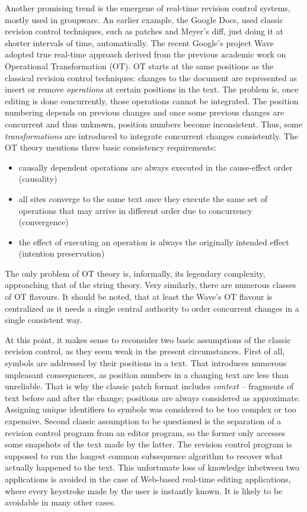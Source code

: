 \documentclass{acm_proc_article-sp}
\begin{document}
Another promising trend is the emergene of real-time
revision control systems, mostly used in groupware.
An earlier example, the Google Docs, used classic revision
control techniques, such as patches and Meyer's diff,
just doing it at shorter intervals of time, automatically.
The recent Google's project Wave adopted true
real-time approach derived from the previous academic
work on Operational Transformation (OT).
OT starts at the same positions as the classical revision
control techniques: changes to the document are represented
as insert or remove \emph{operations} at certain positions in the
text. The problem is, once editing is done concurrently,
those operations cannot be integrated. The position
numbering depends on previous changes and once some previous
changes are concurrent and thus unknown, position numbers
become inconsistent. Thus, some
\emph{transformations} are introduced to integrate concurrent
changes consistently. The OT theory mentions three basic
consistency requirements: 
\begin{itemize}
\item causally dependent operations are always
executed in the cause-effect order (causality)
\item all sites converge to the same text once
they execute the same set of operations that may arrive
in different order due to concurrency (convergence)
\item the effect of executing an operation is
always the originally intended effect (intention preservation)
\end{itemize}
The only problem of OT theory is, informally, its legendary
complexity, approaching that of the string theory.
Very similarly, there are numerous classes of OT flavours.
It should be noted, that at least the Wave's OT flavour
is centralized as it needs a single
central authority to order concurrent changes in a single
consistent way.

At this point, it makes sense to reconsider two basic
assumptions of the classic revision control, as they seem weak
in the present circumstances. First of all, symbols are
addressed by their positions in a text. That introduces
numerous unpleasant consequences, as position numbers
in a changing text are less than unreliable. That is
why the classic patch format includes \emph{context} --
fragments of text before and after the change; positions
are always considered as approximate.
Assigning unique identifiers to symbols was considered
to be too complex or too expensive.
Second classic assumption to be questioned is the
separation of a revision control program from an
editor program, so the former only accesses some snapshots
of the text made by the latter.
The revision control program is supposed to
run the longest common subsequence algorithm to
recover what actually happened to the text.
This unfortunate loss of knowledge inbetween two
applications is avoided in the
case of Web-based real-time editing applications, where
every keystroke made by the user is instantly known.
It is likely to be avoidable in many other cases.
\end{document}
